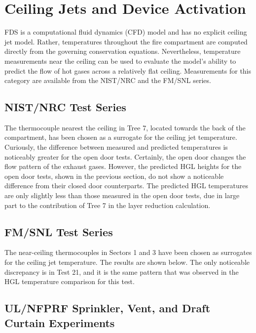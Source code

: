 


\chapter{Ceiling Jets and Device Activation}

FDS is a computational fluid dynamics (CFD) model and has no explicit ceiling jet model.
Rather, temperatures throughout the fire compartment are computed directly from the governing conservation equations.
Nevertheless, temperature measurements near the ceiling can be used to evaluate the model's ability to predict the flow of
hot gases across a relatively flat ceiling. Measurements for this category are available from the NIST/NRC and the FM/SNL series.

\section{NIST/NRC Test Series}

The thermocouple nearest the ceiling in Tree 7, located towards the back of the compartment,
has been chosen as a surrogate for the ceiling jet temperature.
Curiously, the difference between measured and predicted temperatures is noticeably greater for the open door tests.
Certainly, the open door changes the flow pattern of the exhaust gases.
However, the predicted HGL heights for the open door tests, shown in the previous section,
do not show a noticeable difference from their closed door counterparts.
The predicted HGL temperatures are only slightly less than those measured in the open door tests,
due in large part to the contribution of Tree 7 in the layer reduction calculation.



\section{FM/SNL Test Series}

The near-ceiling thermocouples in Sectors 1 and 3 have been chosen as surrogates for the ceiling jet temperature.
The results are shown below.  The only noticeable discrepancy is in Test 21, and it is the same pattern that
was observed in the HGL temperature comparison for this test.





\section{UL/NFPRF Sprinkler, Vent, and Draft Curtain Experiments}
\label{UL_NFPRF:Results}

